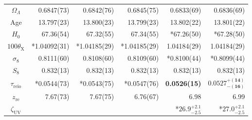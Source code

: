 \documentclass[12pt]{article}
\newcommand{\sampled}{*}
\newcommand{\OmegaL}{\Omega_\Lambda}
\newcommand{\zetaUV}{\zeta_\mathrm{UV}}
\newcommand{\re}{\mathrm{re}}
\newcommand{\reio}{\mathrm{reio}}
\begin{document}
\begin{table}
\begin{tabular*}{0.95\textwidth}{c *{3}{r} @{\extracolsep{\fill}} *{2}{r}}
$\OmegaL$ & 0.6847(73) & 0.6842(76) & 0.6845(75) & 0.6833(69) & 0.6836(69) \\
Age & 13.797(23) & 13.800(23) & 13.799(23) & 13.802(22) & 13.801(22) \\
$H_0$ & 67.36(54) & 67.32(55) & 67.34(55) & \sampled 67.26(50) & \sampled 67.28(50) \\
$100 \theta_\mathrm{X}$ & \sampled 1.04092(31) & \sampled 1.04185(29) & \sampled 1.04185(29) & 1.04184(29) & 1.04184(29) \\
$\sigma_8$ & 0.8111(60) & 0.8108(60) & 0.8109(60) & \sampled 0.8100(44) & \sampled 0.8099(44) \\
$S_8$ & 0.832(13) & 0.832(13) & 0.832(13) & 0.832(13) & 0.832(13) \\
$\tau_\reio$ & \sampled 0.0544(73) & \sampled 0.0543(75) & \sampled 0.0547(76) & \textbf{0.0526(15)} & $\mathbf{0.0527^{+(14)}_{-(16)}}$ \\
$z_\re$ & 7.67(73) & 7.67(75) & 6.76(67) & 6.98 & 6.99 \\
$\zetaUV$ & & & & \sampled $\mathbf{26.9^{+2.1}_{-2.5}}$ & \sampled $\mathbf{27.0^{+2.1}_{-2.5}}$ \\
\hline
\end{tabular*}
\label{tab:uber-table}
\end{table}
\end{document}
